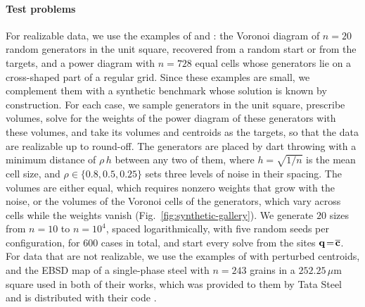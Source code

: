 \documentclass[main.tex]{subfiles}
\begin{document}
\paragraph{Test problems}
For realizable data, we use the examples of \citet{Bourne2025Inverting} and \citet{Bourne2026ConvexOrder}: the Voronoi diagram of $n \!=\! 20$ random generators in the unit square, recovered from a random start or from the targets, and a power diagram with $n \!=\! 728$ equal cells whose generators lie on a cross-shaped part of a regular grid.
Since these examples are small, we complement them with a synthetic benchmark whose solution is known by construction.
For each case, we sample generators in the unit square, prescribe volumes, solve for the weights of the power diagram of these generators with these volumes, and take its volumes and centroids as the targets, so that the data are realizable up to round-off.
The generators are placed by dart throwing with a minimum distance of $\rho\,h$ between any two of them, where $h \!=\! \sqrt{1/n}$ is the mean cell size, and $\rho \!\in\! \{0.8, 0.5, 0.25\}$ sets three levels of noise in their spacing.
The volumes are either equal, which requires nonzero weights that grow with the noise, or the volumes of the Voronoi cells of the generators, which vary across cells while the weights vanish (Fig.~\ref{fig:synthetic-gallery}).
We generate $20$ sizes from $n \!=\! 10$ to $n \!=\! 10^4$, spaced logarithmically, with five random seeds per configuration, for $600$ cases in total, and start every solve from the sites $\mathbf{q} \!=\! \overline{\mathbf{c}}$.
For data that are not realizable, we use the examples of \citet{Bourne2025Inverting} with perturbed centroids, and the EBSD map of a single-phase steel with $n \!=\! 243$ grains in a $252.25\,\mu\mathrm{m}$ square used in both of their works, which was provided to them by Tata Steel and is distributed with their code \cite{Bourne2025Inverting, Bourne2026ConvexOrder}.
\end{document}
